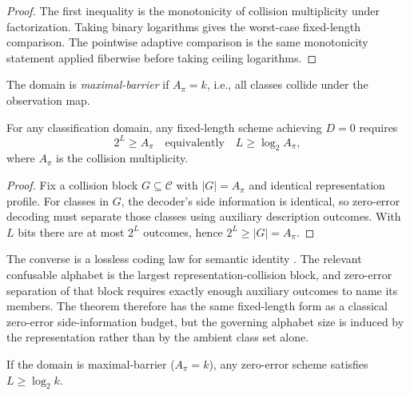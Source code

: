 \begin{proof}
The first inequality is the monotonicity of collision multiplicity under factorization. Taking binary logarithms gives the worst-case fixed-length comparison. The pointwise adaptive comparison is the same monotonicity statement applied fiberwise before taking ceiling logarithms.
\end{proof}

\begin{definition}\label{def:max-barrier}
The domain is \emph{maximal-barrier} if $A_\pi = k$, i.e., all classes collide under the observation map.
\end{definition}

\begin{theorem}[Converse]\label{thm:converse}
For any classification domain, any fixed-length scheme achieving $D=0$ requires
\[
2^L \ge A_\pi
\quad\text{equivalently}\quad
L \ge \log_2 A_\pi,
\]
where $A_\pi$ is the collision multiplicity.
\end{theorem}

\begin{proof}
Fix a collision block $G \subseteq \mathcal{C}$ with $|G|=A_\pi$ and identical representation profile. For classes in $G$, the decoder's side information is identical, so zero-error decoding must separate those classes using auxiliary description outcomes. With $L$ bits there are at most $2^L$ outcomes, hence $2^L \ge |G| = A_\pi$.
\end{proof}

\begin{remark}
The converse is a lossless coding law for semantic identity \cite{csiszar2011information}. The relevant confusable alphabet is the largest representation-collision block, and zero-error separation of that block requires exactly enough auxiliary outcomes to name its members. The theorem therefore has the same fixed-length form as a classical zero-error side-information budget, but the governing alphabet size is induced by the representation rather than by the ambient class set alone.
\end{remark}

\begin{corollary}\label{cor:max-barrier-converse}
If the domain is maximal-barrier ($A_\pi = k$), any zero-error scheme satisfies $L \ge \log_2 k$.
\end{corollary}

